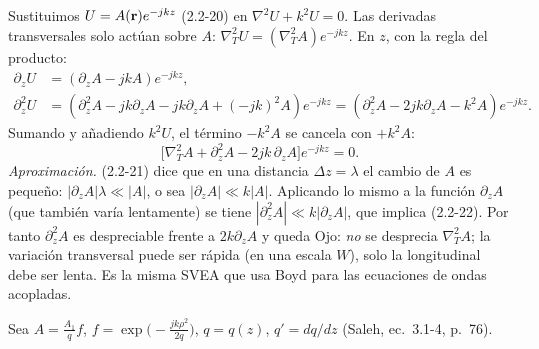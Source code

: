  Sustituimos $U=A(\mathbf r)e^{-jkz}$ (2.2-20) en $\nabla^2U+k^2U=0$. Las derivadas transversales solo actúan
sobre $A$: $\nabla_T^2U=(\nabla_T^2A)e^{-jkz}$. En $z$, con la regla del producto:
\begin{align*}
\partial_zU&=(\partial_zA-jkA)e^{-jkz},\\
\partial_z^2U&=(\partial_z^2A-jk\partial_zA-jk\partial_zA+(-jk)^2A)e^{-jkz}=(\partial_z^2A-2jk\partial_zA-k^2A)e^{-jkz}.
\end{align*}
Sumando y añadiendo $k^2U$, el término $-k^2A$ se cancela con $+k^2A$:
\begin{equation*}
\big[\nabla_T^2A+\partial_z^2A-2jk\,\partial_zA\big]e^{-jkz}=0 .
\end{equation*}
\emph{Aproximación.} (2.2-21) dice que en una distancia $\Delta z=\lambda$ el cambio de $A$ es pequeño:
$|\partial_zA|\lambda\ll|A|$, o sea $|\partial_zA|\ll k|A|$. Aplicando lo mismo a la función $\partial_zA$ (que también
varía lentamente) se tiene $|\partial_z^2A|\ll k|\partial_zA|$, que implica (2.2-22). Por tanto
$\partial_z^2A$ es despreciable frente a $2k\partial_zA$ y queda
Ojo: \emph{no} se desprecia $\nabla_T^2A$; la variación transversal puede ser rápida (en una escala $W$), solo la
longitudinal debe ser lenta. Es la misma SVEA que usa Boyd para las ecuaciones de ondas acopladas.

 Sea $A=\frac{A_1}{q}f$, $f=\exp\!\big(-\frac{jk\rho^2}{2q}\big)$, $q=q(z)$, $q'=dq/dz$ (Saleh, ec.~3.1-4, p.~76).


